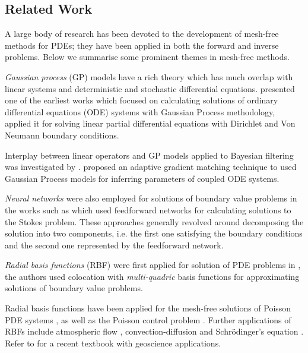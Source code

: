 \subsection{Related Work}

A large body of research has been devoted to the development of mesh-free methods for PDEs; they 
have been applied in both the forward and inverse problems. Below we summarise some prominent 
themes in mesh-free methods.

\emph{Gaussian process} (GP) models \citep{Rasmussen:2005:GPM:1162254} have a rich theory 
which has much overlap with linear systems and deterministic and stochastic differential equations. 
\citet{Skilling1992} presented one of the earliest works which focused on calculating solutions of 
ordinary differential equations (ODE) systems with Gaussian Process methodology, \citet{Graepel} 
applied it for solving linear partial differential equations with Dirichlet and Von Neumann 
boundary conditions.

Interplay between linear operators and GP models applied to Bayesian filtering was investigated by 
\citet{Sarkka2011}. \citet{pmlr-v31-dondelinger13a} proposed an adaptive gradient matching 
technique to used Gaussian Process models for inferring parameters of coupled ODE systems.

\emph{Neural networks} were also employed for solutions of boundary value problems in the 
works such as \citet{Lagaris,Aarts2001,TSOULOS20092385,Baymani2011} which used feedforward networks 
for calculating solutions to the Stokes problem. These approaches generally revolved around 
decomposing the solution into two components, i.e. the first one satisfying the boundary conditions 
and the second one represented by the feedforward network.

\emph{Radial basis functions} (RBF) were first applied for solution of PDE problems in 
\citet{KANSA1990147}, the authors used colocation with \emph{multi-quadric} basis functions for 
approximating solutions of boundary value problems.

Radial basis functions have been applied for the mesh-free solutions of Poisson PDE systems 
\citep{AMINATAEI20082887,DUAN200866,DUAN2006394,CNM:CNM419}, as well as the Poisson control problem 
\citep{Pearson2013}. Further applications of RBFs include atmospheric flow 
\citep{Tillenius2015406}, convection-diffusion \citep{Safdari-Vaighani2015} and Schr\"{o}dinger's 
equation \citep{doi:10.1137/120893975}. Refer to \citet{fornberg2015} for a recent textbook with 
geoscience applications.

